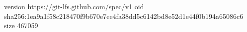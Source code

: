 version https://git-lfs.github.com/spec/v1
oid sha256:1ea9a1f58c218470f9b670e7ee4fa38dd5c6142bd8e52d1e44f0b194a65086c6
size 467059
